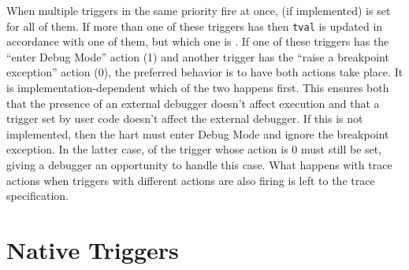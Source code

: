 When multiple triggers in the same priority fire at once, \FcsrMcontrolHit (if
implemented) is set for all of them.  If more than one of these triggers has
 then {\tt tval} is updated in accordance with one of
them, but which one is \unspecified.  If one of these triggers has
the ``enter Debug Mode'' action (1) and another
trigger has the ``raise a breakpoint exception'' action (0),
the preferred behavior is to have both actions take place.  It is
implementation-dependent which of the two happens first.  This ensures both
that the presence of an external debugger doesn't affect execution and that a
trigger set by user code doesn't affect the external debugger. If this is not
implemented, then the hart must enter Debug Mode and ignore the breakpoint
exception. In the latter case, \FcsrMcontrolHit of the trigger whose action is 0 must still
be set, giving a debugger an opportunity to handle this case. What happens with
trace actions when triggers with different actions are also firing is left to
the trace specification.

\section{Native Triggers}
\label{sec:nativetrigger}

